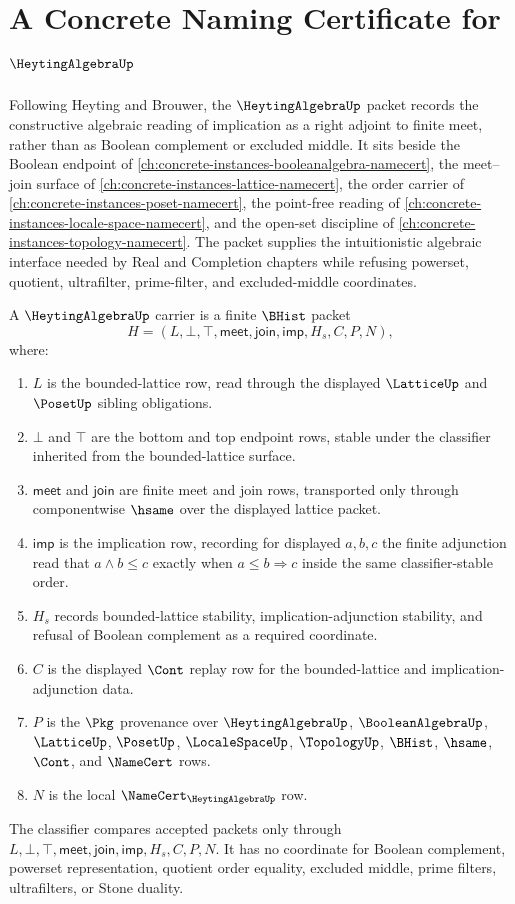 \chapter{A Concrete Naming Certificate for $\HeytingAlgebraUp$}
\label{ch:concrete-instances-heyting-algebra-namecert}

Following Heyting and Brouwer, the $\HeytingAlgebraUp$ packet records the constructive algebraic reading of implication as a right adjoint to finite meet, rather than as Boolean complement or excluded middle. It sits beside the Boolean endpoint of \autoref{ch:concrete-instances-booleanalgebra-namecert}, the meet--join surface of \autoref{ch:concrete-instances-lattice-namecert}, the order carrier of \autoref{ch:concrete-instances-poset-namecert}, the point-free reading of \autoref{ch:concrete-instances-locale-space-namecert}, and the open-set discipline of \autoref{ch:concrete-instances-topology-namecert}. The packet supplies the intuitionistic algebraic interface needed by Real and Completion chapters while refusing powerset, quotient, ultrafilter, prime-filter, and excluded-middle coordinates.

\begin{definition}
\label{def:heyting-algebra-carrier}
A $\HeytingAlgebraUp$ carrier is a finite $\BHist$ packet
$$
H=(L,\bot,\top,\mathsf{meet},\mathsf{join},\mathsf{imp},H_s,C,P,N),
$$
where:
\begin{enumerate}
\item $L$ is the bounded-lattice row, read through the displayed $\LatticeUp$ and $\PosetUp$ sibling obligations.
\item $\bot$ and $\top$ are the bottom and top endpoint rows, stable under the classifier inherited from the bounded-lattice surface.
\item $\mathsf{meet}$ and $\mathsf{join}$ are finite meet and join rows, transported only through componentwise $\hsame$ over the displayed lattice packet.
\item $\mathsf{imp}$ is the implication row, recording for displayed $a,b,c$ the finite adjunction read that $a \wedge b \leq c$ exactly when $a \leq b \Rightarrow c$ inside the same classifier-stable order.
\item $H_s$ records bounded-lattice stability, implication-adjunction stability, and refusal of Boolean complement as a required coordinate.
\item $C$ is the displayed $\Cont$ replay row for the bounded-lattice and implication-adjunction data.
\item $P$ is the $\Pkg$ provenance over $\HeytingAlgebraUp$, $\BooleanAlgebraUp$, $\LatticeUp$, $\PosetUp$, $\LocaleSpaceUp$, $\TopologyUp$, $\BHist$, $\hsame$, $\Cont$, and $\NameCert$ rows.
\item $N$ is the local $\NameCert_{\HeytingAlgebraUp}$ row.
\end{enumerate}
The classifier compares accepted packets only through $L,\bot,\top,\mathsf{meet},\mathsf{join},\mathsf{imp},H_s,C,P,N$. It has no coordinate for Boolean complement, powerset representation, quotient order equality, excluded middle, prime filters, ultrafilters, or Stone duality.
\end{definition}

